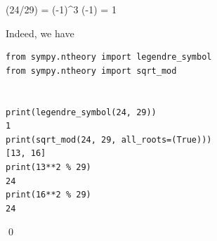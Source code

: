 \bee
(24/29) = (-1)^3 (-1) = 1
\eee

Indeed, we have

\begin{verbatim}
from sympy.ntheory import legendre_symbol
from sympy.ntheory import sqrt_mod


print(legendre_symbol(24, 29))
1
print(sqrt_mod(24, 29, all_roots=(True)))
[13, 16]
print(13**2 % 29)
24
print(16**2 % 29)
24
\end{verbatim}
\qed



